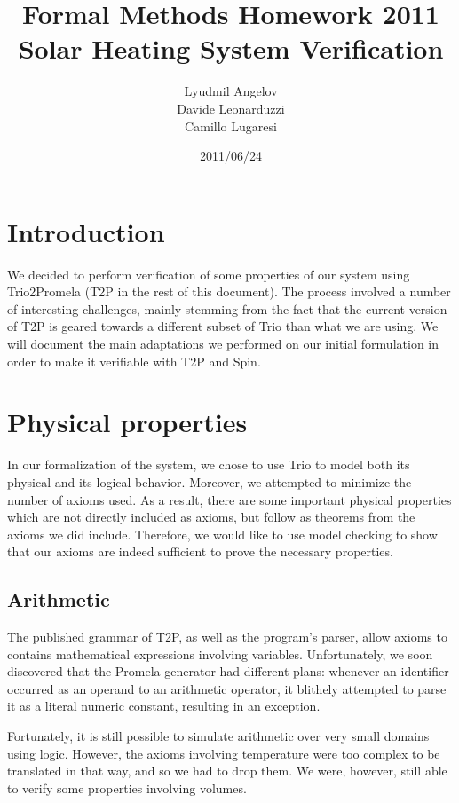 \documentclass[a4paper,12pt]{article}
\begin{document}
\title{Formal Methods Homework 2011\\
Solar Heating System Verification}
\author{Lyudmil Angelov\\
Davide Leonarduzzi\\
Camillo Lugaresi}
\date{2011/06/24}
\maketitle

\section{Introduction}

We decided to perform verification of some properties of our system using Trio2Promela (T2P in the rest of this document). The process involved a number of interesting challenges, mainly stemming from the fact that the current version of T2P is geared towards a different subset of Trio than what we are using. We will document the main adaptations we performed on our initial formulation in order to make it verifiable with T2P and Spin.

\section{Physical properties}

In our formalization of the system, we chose to use Trio to model both its physical and its logical behavior. Moreover, we attempted to minimize the number of axioms used. As a result, there are some important physical properties which are not directly included as axioms, but follow as theorems from the axioms we did include. Therefore, we would like to use model checking to show that our axioms are indeed sufficient to prove the necessary properties.

\subsection{Arithmetic}

The published grammar of T2P, as well as the program's parser, allow axioms to contains mathematical expressions involving variables. Unfortunately, we soon discovered that the Promela generator had different plans: whenever an identifier occurred as an operand to an arithmetic operator, it blithely attempted to parse it as a literal numeric constant, resulting in an exception.

Fortunately, it is still possible to simulate arithmetic over very small domains using logic. However, the axioms involving temperature were too complex to be translated in that way, and so we had to drop them. We were, however, still able to verify some properties involving volumes.
\end{document}
